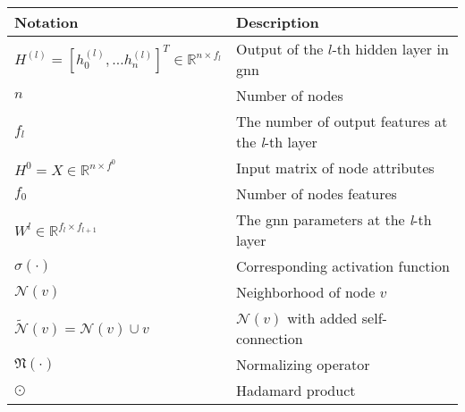 \begin{center}
    \begin{tabular}{ll}
        \toprule
        \textbf{Notation}                                                            & \textbf{Description}                                     \\
        \midrule
        $H^{(l)}= [h_{0}^{(l)},\dots h_{n}^{(l)}]^T \in \mathbb{R}^{n \times f_{l}}$ & Output of the $l$-th hidden layer in \ac{gnn}            \\
        $n$                                                                          & Number of nodes                                          \\
        $f_{l}$                                                                      & The number of output features at the \textit{l}-th layer \\
        $H^{0}= X \in \mathbb{R}^{n \times f^{0}}$                                   & Input matrix of node attributes                          \\
        $f_{0}$                                                                      & Number of nodes features                                 \\
        $W^{l} \in \mathbb{R}^{f_{l} \times f_{l+1}}$                                & The \ac{gnn} parameters at the \textit{l}-th layer       \\
        $\sigma (\cdot)$                                                             & Corresponding activation function                        \\
        $\mathcal{N}(v)$                                                             & Neighborhood of node $v$                                 \\
        $\tilde{\mathcal{N}}(v) = \mathcal{N}(v) \cup {v}$                           & $\mathcal{N}(v)$  with added self-connection             \\
        $\mathfrak{N}(\cdot)$                                                        & Normalizing operator                                     \\
        $\odot$                                                                      & Hadamard product                                         \\
        \bottomrule
    \end{tabular}
\end{center}


